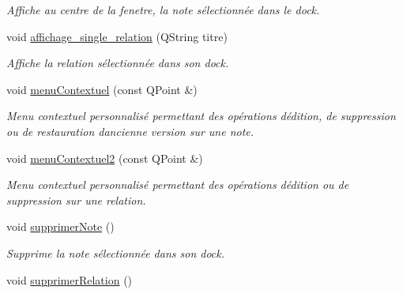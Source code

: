 \begin{DoxyCompactItemize}
\begin{DoxyCompactList}\small\item\em Affiche au centre de la fenetre, la note sélectionnée dans le dock. \end{DoxyCompactList}\item 
void \hyperlink{class_fen_principale_a67e142066003277638ed8b7dc67b19e9}{affichage\+\_\+single\+\_\+relation} (Q\+String titre)
\begin{DoxyCompactList}\small\item\em Affiche la relation sélectionnée dans son dock. \end{DoxyCompactList}\item 
\mbox{\label{class_fen_principale_a55596abf1539b9b6012fc89f0e9c3d6a}} 
void \hyperlink{class_fen_principale_a55596abf1539b9b6012fc89f0e9c3d6a}{menu\+Contextuel} (const Q\+Point \&)
\begin{DoxyCompactList}\small\item\em Menu contextuel personnalisé permettant des opérations d\textquotesingle{}édition, de suppression ou de restauration d\textquotesingle{}ancienne version sur une note. \end{DoxyCompactList}\item 
\mbox{\label{class_fen_principale_a6518d75ce88927fbd121e465bae896f4}} 
void \hyperlink{class_fen_principale_a6518d75ce88927fbd121e465bae896f4}{menu\+Contextuel2} (const Q\+Point \&)
\begin{DoxyCompactList}\small\item\em Menu contextuel personnalisé permettant des opérations d\textquotesingle{}édition ou de suppression sur une relation. \end{DoxyCompactList}\item 
\mbox{\label{class_fen_principale_abdbd0250f3c3e037bfa7cd27c5162baf}} 
void \hyperlink{class_fen_principale_abdbd0250f3c3e037bfa7cd27c5162baf}{supprimer\+Note} ()
\begin{DoxyCompactList}\small\item\em Supprime la note sélectionnée dans son dock. \end{DoxyCompactList}\item 
\mbox{\label{class_fen_principale_a7dbafe44ea212955ba0b7d674ab5cc9d}} 
void \hyperlink{class_fen_principale_a7dbafe44ea212955ba0b7d674ab5cc9d}{supprimer\+Relation} ()

\end{DoxyCompactItemize}
